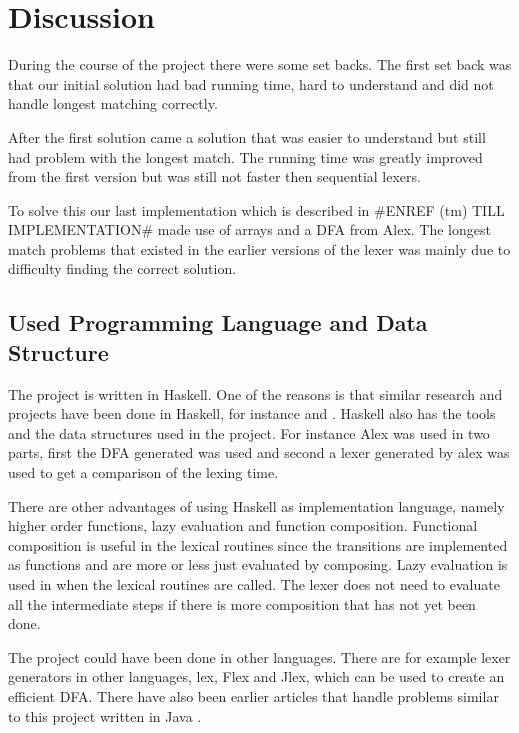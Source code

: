 \chapter{Discussion}
During the course of the project there were some set backs. The first set back
was that our initial solution had bad running time, hard to understand and did
not handle longest matching correctly.

After the first solution came a solution
that was easier to understand but still had problem with the longest match. The
running time was greatly improved from the first version but was still not
faster then sequential lexers.

To solve this our last implementation which is
described in \#ENREF (tm) TILL IMPLEMENTATION\# made use of arrays and a DFA from
Alex. The longest match problems that existed in the earlier versions of the
lexer was mainly due to difficulty finding the correct solution.

\section{Used Programming Language and Data Structure}
The project is written in Haskell. One of the reasons is that similar
research and projects have been done in Haskell, for instance \cite{blog} and \cite{fingertree}.
Haskell also has the tools and the data structures used in the project. For
instance Alex was used in two parts, first the DFA generated was used and second
a lexer generated by alex was used to get a comparison of the lexing time.

There are other advantages of using Haskell as implementation language, namely
higher order functions, lazy evaluation and function composition. Functional
composition is useful in the lexical routines since the transitions are
implemented as functions and are more or less just evaluated by composing.
Lazy evaluation is used in when the lexical routines are called. The lexer does
not need to evaluate all the intermediate steps if there is more composition
that has not yet been done.

The project could have been done in other languages. There are for example
lexer generators in other languages, lex, Flex and Jlex, which can be used to
create an efficient DFA. There have also been earlier articles that handle
problems similar to this project written in Java \cite{JavaIncRegExp}.

